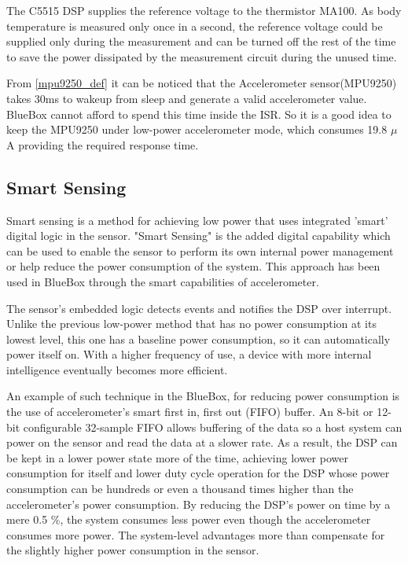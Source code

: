  The C5515 DSP supplies the reference voltage to the thermistor MA100. As body temperature is measured only once in a second, the reference voltage could be supplied only during the measurement and can be turned off the rest of the time to save the power dissipated by the measurement circuit during the unused time.
 
 From \ref{mpu9250_def} it can be noticed that the Accelerometer sensor(MPU9250) takes 30ms to wakeup from sleep and generate a valid accelerometer  value. BlueBox cannot afford to spend this time inside the ISR. So it is a good idea to keep the MPU9250 under low-power accelerometer mode, which consumes 19.8 $\mu$A providing the required response time.
 
 \subsection{Smart Sensing}
 Smart sensing is a method for achieving low power that uses integrated 'smart' digital logic in the sensor. "Smart Sensing" is the added digital capability which can be used to enable the sensor to perform its own internal power management or help reduce the power consumption of the system. This approach has been used in BlueBox through the smart capabilities of accelerometer.
 
The sensor's embedded logic detects events and notifies the DSP over interrupt. Unlike the previous low-power method that has no power consumption at its lowest level, this one has a baseline power consumption, so it can automatically power itself on. With a higher frequency of use, a device with more internal intelligence eventually becomes more efficient. 
 
 An example of such technique in the BlueBox, for reducing power consumption is the use of
 accelerometer’s smart first in, first out (FIFO) buffer. An 8-bit or 12-bit configurable 32-sample 
 FIFO allows buffering of the data so a host system can power on the sensor and read the 
 data at a slower rate. As a result, the DSP can be kept in a lower power state more of 
 the time, achieving lower power consumption for itself and lower duty cycle operation for 
 the DSP whose power consumption can be hundreds or even a thousand times 
 higher than the accelerometer’s power consumption. By reducing the DSP’s power 
 on time by a mere 0.5 \%, the system consumes less power even though the accelerometer 
 consumes more power. The system-level advantages more than compensate for the slightly 
 higher power consumption in the sensor. 
 
